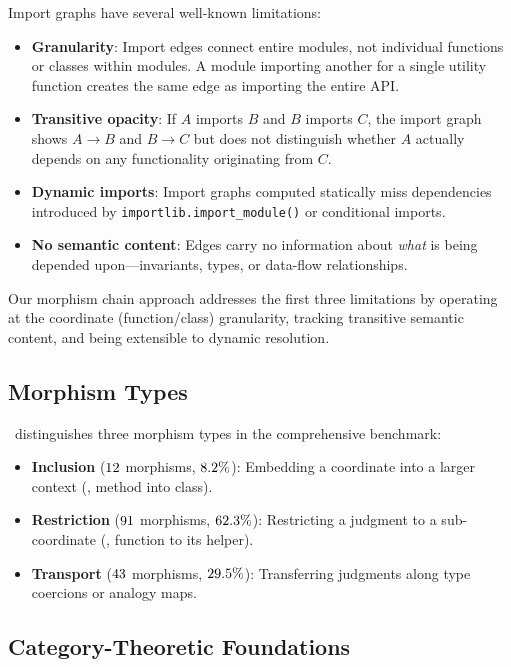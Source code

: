 \documentclass[11pt]{article}
\begin{document}
Import graphs have several well-known limitations:
\begin{itemize}[noitemsep]
  \item \textbf{Granularity}: Import edges connect entire modules, not
        individual functions or classes within modules.  A module importing
        another for a single utility function creates the same edge as
        importing the entire API.
  \item \textbf{Transitive opacity}: If $A$ imports $B$ and $B$ imports $C$,
        the import graph shows $A \to B$ and $B \to C$ but does not
        distinguish whether $A$ actually depends on any functionality
        originating from $C$.
  \item \textbf{Dynamic imports}: Import graphs computed statically miss
        dependencies introduced by \texttt{importlib.import\_module()} or
        conditional imports.
  \item \textbf{No semantic content}: Edges carry no information about
        \emph{what} is being depended upon---invariants, types, or
        data-flow relationships.
\end{itemize}
Our morphism chain approach addresses the first three limitations by
operating at the coordinate (function/class) granularity, tracking
transitive semantic content, and being extensible to dynamic resolution.

\subsection{Morphism Types}
\JuGeo\ distinguishes three morphism types in the comprehensive benchmark:
\begin{itemize}[noitemsep]
  \item \textbf{Inclusion} ($12$ morphisms,
        $8.2\%$): Embedding a coordinate into a larger
        context (\eg, method into class).
  \item \textbf{Restriction} ($91$ morphisms,
        $62.3\%$): Restricting a judgment to a
        sub-coordinate (\eg, function to its helper).
  \item \textbf{Transport} ($43$ morphisms,
        $29.5\%$): Transferring judgments along type
        coercions or analogy maps.
\end{itemize}

\subsection{Category-Theoretic Foundations}\label{sec:cat-foundations}
\end{document}
